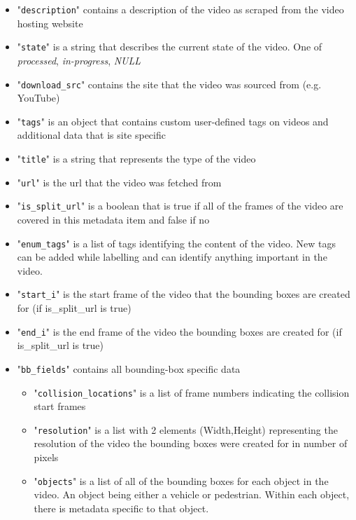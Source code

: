 \documentclass[letterpaper, 10 pt, conference]{IEEEconf}
\begin{document}
\begin{itemize}
  \item "\texttt{description}" contains a description of the video as scraped from the video hosting website
  \item "\texttt{state}" is a string that describes the current state of the video. One of \textit{processed}, \textit{in-progress}, \textit{NULL}
  \item "\texttt{download\_src}" contains the site that the video was sourced from (e.g. YouTube)
  \item "\texttt{tags}" is an object that contains custom user-defined tags on videos and additional data that is site specific
  \item "\texttt{title}" is a string that represents the type of the video
  \item "\texttt{url}" is the url that the video was fetched from
  \item "\texttt{is\_split\_url}" is a boolean that is true if all of the frames of the video are covered in this metadata item and false if no
  \item "\texttt{enum\_tags}" is a list of tags identifying the content of the video. New tags can be added while labelling and can identify anything important in the video.
  \item "\texttt{start\_i}" is the start frame of the video that the bounding boxes are created for (if is\_split\_url is true)
  \item "\texttt{end\_i}" is the end frame of the video the bounding boxes are created for (if is\_split\_url is true)
  \item "\texttt{bb\_fields}" contains all bounding-box specific data
  \begin{itemize}
    \item "\texttt{collision\_locations}" is a list of frame numbers indicating the collision start frames
    \item "\texttt{resolution}" is a list with 2 elements (Width,Height) representing the resolution of the video the bounding boxes were created for in number of pixels 
    \item "\texttt{objects}" is a list of all of the bounding boxes for each object in the video. An object being either a vehicle or pedestrian. Within each object, there is metadata specific to that object.
    \begin{itemize}

\end{itemize}
\end{itemize}
\end{itemize}
\end{document}
